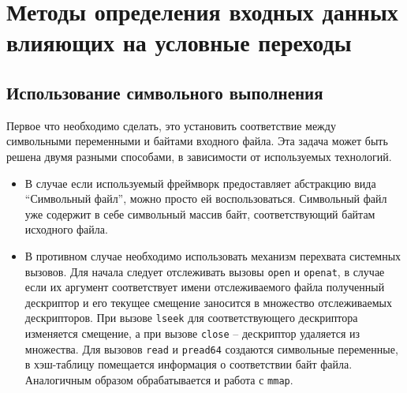 \chapter{Методы определения входных данных влияющих на условные переходы}









\section{Использование символьного выполнения}

Первое что необходимо сделать, это установить соответствие между символьными переменными и байтами входного файла. Эта задача может быть решена двумя разными способами, в зависимости от используемых технологий.

\begin{itemize}
    \item В случае если используемый фреймворк предоставляет абстракцию вида ``Символьный файл'', можно просто ей воспользоваться. Символьный файл уже содержит в себе символьный массив байт, соответствующий байтам исходного файла.
    \item В противном случае необходимо использовать механизм перехвата системных вызовов. Для начала следует отслеживать вызовы \texttt{open} и \texttt{openat}, в случае если их аргумент соответствует имени отслеживаемого файла полученный дескриптор и его текущее смещение заносится в множество отслеживаемых дескрипторов. При вызове \texttt{lseek} для соответствующего дескриптора изменяется смещение, а при вызове \texttt{close} -- дескриптор удаляется из множества. Для вызовов \texttt{read} и \texttt{pread64} создаются символьные переменные, в хэш-таблицу помещается информация о соответствии байт файла. Аналогичным образом обрабатывается и работа с \texttt{mmap}.
\end{itemize}



